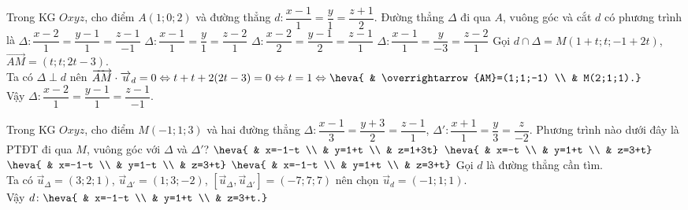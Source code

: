 \begin{ex}%
Trong KG $Oxyz$, cho điểm  $A(1;0;2)$ và đường thẳng $d\colon \dfrac{x-1}{1}=\dfrac{y}{1}=\dfrac{z+1}{2}$. Đường thẳng $\Delta$ đi qua $A$, vuông góc và cắt $d$ có phương trình là
\choice
{\True $\Delta\colon \dfrac{x-2}{1}=\dfrac{y-1}{1}=\dfrac{z-1}{-1}$}
{$\Delta\colon \dfrac{x-1}{1}=\dfrac{y}{1}=\dfrac{z-2}{1}$}
{$\Delta\colon \dfrac{x-2}{2}=\dfrac{y-1}{2}=\dfrac{z-1}{1}$}
{$\Delta\colon \dfrac{x-1}{1}=\dfrac{y}{-3}=\dfrac{z-2}{1}$}
\loigiai
{
Gọi $d\cap\Delta=M(1+t;t;-1+2t)$, $\overrightarrow{AM}=(t;t;2t-3)$.\\
Ta có $\Delta\perp d$ nên $\overrightarrow{AM}\cdot\overrightarrow{u}_{d}=0 \Leftrightarrow t+t+2(2t-3)=0 \Leftrightarrow t=1 \Leftrightarrow \heva{ & \overrightarrow{AM}=(1;1;-1) \\ & M(2;1;1).}$\\
Vậy $\Delta\colon \dfrac{x-2}{1}=\dfrac{y-1}{1}=\dfrac{z-1}{-1}$.
}
\end{ex}

\begin{ex}%
Trong KG $Oxyz$, cho điểm  $M(-1;1;3)$ và hai đường thẳng $\Delta\colon \dfrac{x-1}{3}=\dfrac{y+3}{2}=\dfrac{z-1}{1}$, $\Delta'\colon \dfrac{x+1}{1}=\dfrac{y}{3}=\dfrac{z}{-2}$. Phương trình nào dưới đây là PTĐT đi qua $M$, vuông góc với $\Delta$ và $\Delta'$?
\choice
{$\heva{ & x=-1-t \\ & y=1+t \\ & z=1+3t}$}
{$\heva{ & x=-t \\ & y=1+t \\ & z=3+t}$}
{$\heva{ & x=-1-t \\ & y=1-t \\ & z=3+t}$}
{\True $\heva{ & x=-1-t \\ & y=1+t \\ & z=3+t}$}
\loigiai
{
Gọi $d$ là đường thẳng cần tìm.\\
Ta có $\overrightarrow{u}_{\Delta}=(3;2;1)$, $\overrightarrow{u}_{\Delta'}=(1;3;-2)$, $\left[\overrightarrow{u}_{\Delta},\overrightarrow{u}_{\Delta'}\right]=(-7;7;7)$ nên chọn $\overrightarrow{u}_{d}=(-1;1;1)$.\\
Vậy $d\colon \heva{ & x=-1-t \\ & y=1+t \\ & z=3+t.}$
}
\end{ex}

